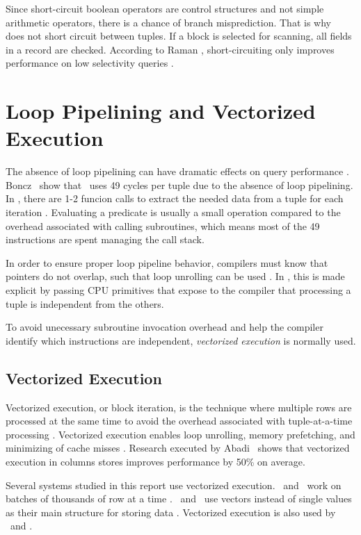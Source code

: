 Since short-circuit boolean operators are control structures and not simple arithmetic operators, there is a chance of branch misprediction. That is why \blink~\cite{Raman2008-gi, Johnson2008-cp} does not short circuit between tuples. If a block is selected for scanning, all fields in a record are checked. According to Raman \ea, short-circuiting only improves performance on low selectivity queries \cite{Raman2008-gi}.


\section{Loop Pipelining and Vectorized Execution}
\label{sec:Loop Pipelining and Vectorized Execution}
The absence of loop pipelining can have dramatic effects on query performance \cite{Boncz2005-wj}. Boncz \ea~show that \mysql~uses 49 cycles per tuple due to the absence of loop pipelining. In \mysql, there are 1-2 funcion calls to extract the needed data from a tuple for each iteration \cite{Abadi2008-dd}. Evaluating a predicate is usually a small operation compared to the overhead associated with calling subroutines, which means most of the 49 instructions are spent managing the call stack.

In order to ensure proper loop pipeline behavior, compilers must know that pointers do not overlap, such that loop unrolling can be used \cite{Boncz2005-wj}. In \monetx, this is made explicit by passing CPU primitives that expose to the compiler that processing a tuple is independent from the others.

To avoid unecessary subroutine invocation overhead and help the compiler identify which instructions are independent, \textit{vectorized execution} is normally used.

\subsection{Vectorized Execution}
\label{sub:Vectorized Execution}
Vectorized execution, or block iteration, is the technique where multiple rows are processed at the same time to avoid the overhead associated with tuple-at-a-time processing \cite{Abadi2008-dd}. Vectorized execution enables loop unrolling, memory prefetching, and minimizing of cache misses \cite{Larson2013-mc}. Research executed by Abadi \ea~shows that vectorized execution in columns stores improves performance by 50\% on average.

Several systems studied in this report use vectorized execution. \ibm~and \mssql~work on batches of thousands of row at a time \cite{Larson2013-mc, Raman2013-em}. \monetdb~and \monetx~use vectors instead of single values as their main structure for storing data \cite{Boncz2002-yj, Boncz2005-wj}. Vectorized execution is also used by \cstore~and \blink \cite{Johnson2008-cp, Stonebraker2005-qz}.

